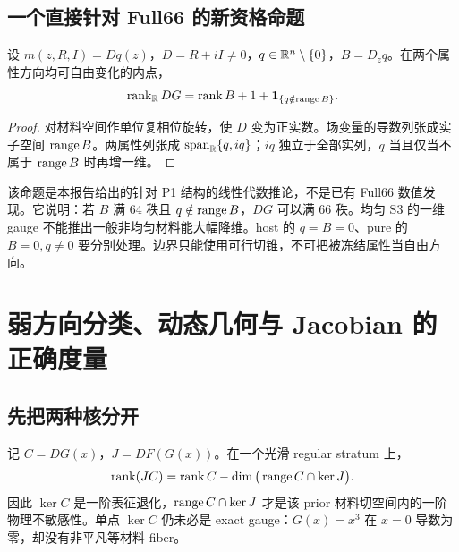 \subsection{一个直接针对 Full66 的新资格命题}
\begin{lemma}
设 $m(z,R,I)=Dq(z)$，$D=R+iI\ne0$，$q\in\mathbb R^n\setminus\{0\}$，$B=D_zq$。在两个属性方向均可自由变化的内点，
\begin{equation}
\operatorname{rank}_{\mathbb R}DG=\operatorname{rank} B+1+\mathbf1_{\{q\notin\operatorname{range} B\}}.
\label{eq:rank-decoder}
\end{equation}
\end{lemma}
\begin{proof}
对材料空间作单位复相位旋转，使 $D$ 变为正实数。场变量的导数列张成实子空间 $\operatorname{range} B$。两属性列张成 $\operatorname{span}_{\mathbb R}\{q,iq\}$；$iq$ 独立于全部实列，$q$ 当且仅当不属于 $\operatorname{range} B$ 时再增一维。
\end{proof}
该命题是本报告给出的针对 P1 结构的线性代数推论，不是已有 Full66 数值发现。它说明：若 $B$ 满 64 秩且 $q\notin\operatorname{range} B$，$DG$ 可以满 66 秩。均匀 S3 的一维 gauge 不能推出一般非均匀材料能大幅降维。host 的 $q=B=0$、pure 的 $B=0,q\ne0$ 要分别处理。边界只能使用可行切锥，不可把被冻结属性当自由方向。

\section{弱方向分类、动态几何与 Jacobian 的正确度量}
\label{sec:weak}

\subsection{先把两种核分开}
记 $C=DG(x)$，$J=DF(G(x))$。在一个光滑 regular stratum 上，
\begin{equation}
\operatorname{rank}(JC)=\operatorname{rank} C-\dim\big(\operatorname{range} C\cap\ker J\big).
\label{eq:rank-chain}
\end{equation}
因此 $\ker C$ 是一阶表征退化，$\operatorname{range} C\cap\ker J$ 才是该 prior 材料切空间内的一阶物理不敏感性。单点 $\ker C$ 仍未必是 exact gauge：$G(x)=x^3$ 在 $x=0$ 导数为零，却没有非平凡等材料 fiber。

